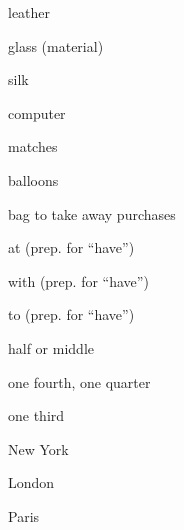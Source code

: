 \begin{flashcard}{\LARGE leather}
\LARGE {}
\end{flashcard}
\begin{flashcard}{\LARGE glass (material)}
\LARGE {}
\end{flashcard}
\begin{flashcard}{\LARGE silk}
\LARGE {}
\end{flashcard}
\begin{flashcard}{\LARGE computer}
\LARGE {}
\end{flashcard}
\begin{flashcard}{\LARGE matches}
\LARGE {}
\end{flashcard}
\begin{flashcard}{\LARGE balloons}
\LARGE {}
\end{flashcard}
\begin{flashcard}{\LARGE bag to take away purchases}
\LARGE {}
\end{flashcard}
\begin{flashcard}{\LARGE at (prep. for ``have'')}
\LARGE {}
\end{flashcard}
\begin{flashcard}{\LARGE with (prep. for ``have'')}
\LARGE {}
\end{flashcard}
\begin{flashcard}{\LARGE to (prep. for ``have'')}
\LARGE {}
\end{flashcard}
\begin{flashcard}{\LARGE half or middle}
\LARGE {}
\end{flashcard}
\begin{flashcard}{\LARGE one fourth, one quarter}
\LARGE {}
\end{flashcard}
\begin{flashcard}{\LARGE one third}
\LARGE {}
\end{flashcard}
\begin{flashcard}{\LARGE New York}
\LARGE {}
\end{flashcard}
\begin{flashcard}{\LARGE London}
\LARGE {}
\end{flashcard}
\begin{flashcard}{\LARGE Paris}
\LARGE {}
\end{flashcard}

